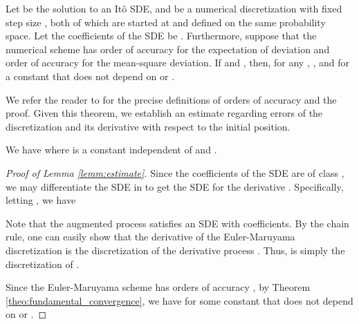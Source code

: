 \documentclass[twoside]{article}
\begin{document}
\begin{theo}\label{theo:fundamental_convergence}
Let  be the solution to an It\^o SDE, and  be a numerical discretization with fixed step size , both of which are started at  and defined on the same probability space.
Let the coefficients of the SDE be . Furthermore, suppose that the numerical scheme has order of accuracy  for the expectation of deviation and order of accuracy  for the mean-square deviation. If  and , then, for any , , and 
for a constant  that does not depend on  or .
\end{theo}

We refer the reader to \citep{milstein2013stochastic} for the precise definitions of orders of accuracy and the proof. Given this theorem, we establish an estimate regarding errors of the discretization and its derivative with respect to the initial position.

\begin{lemm}\label{lemm:estimate}
We have
where  is a constant independent of  and .
\end{lemm}

\begin{proof}[Proof of Lemma \ref{lemm:estimate}]
Since the coefficients of the SDE are of class , we may differentiate the SDE in  to get the SDE for the derivative  \citep{kunita2019stochastic}. 
Specifically, letting , we have


Note that the augmented process  satisfies an SDE with  coefficients. 
By the chain rule, one can easily show that the derivative of the Euler-Maruyama discretization  is the discretization of the derivative process . 
Thus,  is simply the discretization of .

Since the Euler-Maruyama scheme has orders of accuracy  \citep[Section 1.1.5]{milstein2013stochastic}, by Theorem \ref{theo:fundamental_convergence}, we have 
for some constant  that does not depend on  or .
\end{proof}
\end{document}
